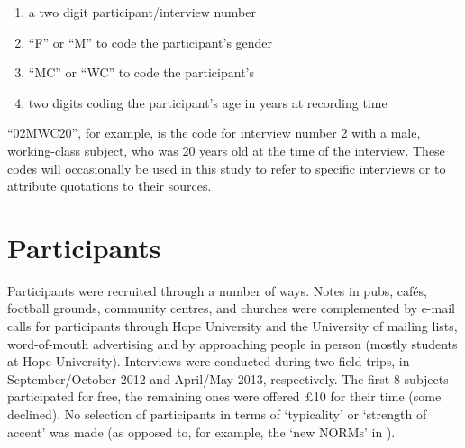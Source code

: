 \begin{enumerate}
	\item a two digit participant/interview number
	\item ``F'' or ``M'' to code the participant's gender
	\item ``MC'' or ``WC'' to code the participant's 
	\item two digits coding the participant's age in years at recording time
\end{enumerate}

``02MWC20'', for example, is the code for interview number 2 with a male, working-class subject, who was 20 years old at the time of the interview.
These codes will occasionally be used in this study to refer to specific interviews or to attribute quotations to their sources.

	\section{Participants}\label{sec.prod_method.participants}
	
Participants were recruited through a number of ways. Notes in pubs, cafés, football grounds, community centres, and churches were complemented by e-mail calls for participants through Hope University and the University of  mailing lists, word-of-mouth advertising and by approaching people in person (mostly students at  Hope University). Interviews were conducted during two field trips, in September/October 2012 and April/May 2013, respectively. The first 8 subjects participated for free, the remaining ones were offered £10 for their time (some declined). No selection of participants in terms of `typicality' or `strength of accent' was made (as opposed to, for example, the `new NORMs' in \citealt{honeybone2001}).

